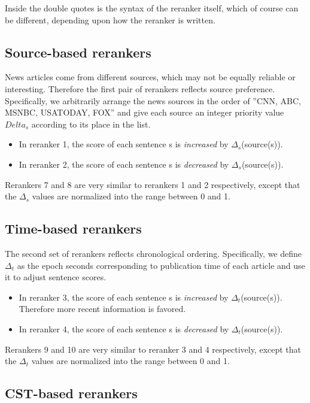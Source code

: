 \documentclass[10pt]{article}
\begin{document}
Inside the double quotes is the syntax of the reranker itself, which of course can 
be different, depending upon how the reranker is written.


\subsection{Source-based rerankers}

News articles come from different sources, which may not be equally
reliable or interesting. Therefore the first pair of rerankers
reflects source preference.  Specifically, we arbitrarily arrange the
news sources in the order of ''CNN, ABC, MSNBC, USATODAY, FOX'' and
give each source an integer priority value $Delta_s$ according to its
place in the list.

\begin{itemize}
\item In reranker 1, the score of each sentence s is {\em increased}
 by $\Delta_s$(source(s)).
\item In reranker 2, the score of each sentence s is {\em decreased}
 by $\Delta_s$(source(s)).
\end{itemize}

Rerankers 7 and 8 are very similar to rerankers 1 and 2
respectively, except that the $\Delta_s$ values are normalized
into the range between 0 and 1.

\subsection{Time-based rerankers}

The second set of rerankers reflects chronological
ordering. Specifically, we define $\Delta_t$ as the epoch seconds
corresponding to publication time of each article and use it to adjust
sentence scores.

\begin{itemize}
\item In reranker 3, the score of each sentence s is {\em increased}
 by $\Delta_t$(source(s)). Therefore more recent information is favored.
\item In reranker 4, the score of each sentence s is {\em decreased}
 by $\Delta_t$(source(s)).
\end{itemize}

Rerankers 9 and 10 are very similar to reranker 3 and 4
respectively, except that the $\Delta_t$ values are normalized
into the range between 0 and 1.

\subsection{CST-based rerankers}
\end{document}
